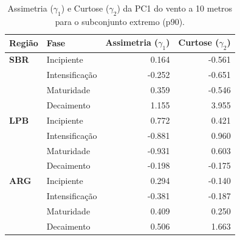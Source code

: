 \begin{table}[htbp]
\centering
\caption[Assimetria e Curtose da PC1 do vento a 10 m --- Subconjunto p90]{Assimetria ($\gamma_1$) e Curtose ($\gamma_2$) da PC1 do vento a 10 metros para o subconjunto extremo (p90).}
\label{tab:momentos_p90_w10}
\begin{tabular*}{\textwidth}{@{\extracolsep{\fill}}llrr}
\hline
\textbf{Região} & \textbf{Fase} & \textbf{Assimetria ($\gamma_1$)} & \textbf{Curtose ($\gamma_2$)} \\
\hline
\textbf{SBR} & Incipiente & 0.164 & -0.561 \\
 & Intensificação & -0.252 & -0.651 \\
 & Maturidade & 0.359 & -0.546 \\
 & Decaimento & 1.155 & 3.955 \\
\hline
\textbf{LPB} & Incipiente & 0.772 & 0.421 \\
 & Intensificação & -0.881 & 0.960 \\
 & Maturidade & -0.931 & 0.603 \\
 & Decaimento & -0.198 & -0.175 \\
\hline
\textbf{ARG} & Incipiente & 0.294 & -0.140 \\
 & Intensificação & -0.381 & -0.187 \\
 & Maturidade & 0.409 & 0.250 \\
 & Decaimento & 0.506 & 1.663 \\
\hline
\end{tabular*}
\end{table}